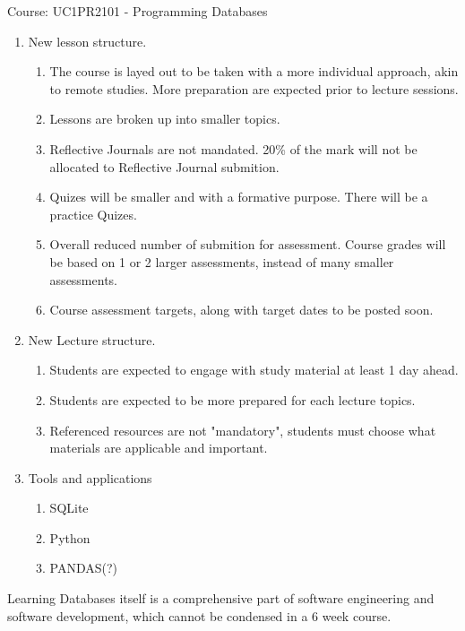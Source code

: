 {Course: UC1PR2101 - Programming Databases

\begin{enumerate}
    \item New lesson structure.
        \begin{enumerate}
            \item The course is layed out to be taken with a more individual approach, akin to remote studies. More preparation are expected prior to lecture sessions.
            \item Lessons are broken up into smaller topics.
            \item Reflective Journals are not mandated. 20\% of the mark will not be allocated to Reflective Journal submition.
            \item Quizes will be smaller and with a formative purpose. There will be a practice Quizes.
            \item Overall reduced number of submition for assessment. Course grades will be based on 1 or 2 larger assessments, instead of many smaller assessments.
            \item Course assessment targets, along with target dates to be posted soon.
        \end{enumerate}
    \item New Lecture structure.
        \begin{enumerate}
            \item Students are expected to engage with study material at least 1 day ahead.
            \item Students are expected to be more prepared for each lecture topics.
            \item Referenced resources are not "mandatory", students must choose what materials are applicable and important.
        \end{enumerate}
    \item Tools and applications
        \begin{enumerate}
            \item SQLite
            \item Python
            \item PANDAS(?)
        \end{enumerate}
\end{enumerate}

Learning Databases itself is a comprehensive part of software engineering and software development, which cannot be condensed in a 6 week course.

}
